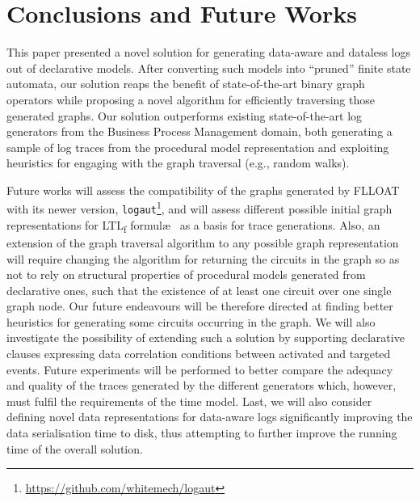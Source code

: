 \documentclass[sigconf]{acmart}
\newcommand{\LTLf}{\textup{LTL}\textsubscript{f}\xspace}
\begin{document}
\section{Conclusions and Future Works}\label{sec:conclfut}
This paper presented a novel solution for generating data-aware and dataless logs out of declarative models. After converting such models into ``pruned'' finite state automata, our solution reaps the benefit of state-of-the-art binary graph operators while proposing a novel algorithm for efficiently traversing those generated graphs. Our solution outperforms existing state-of-the-art log generators from the Business Process Management domain, both generating a sample of log traces from the procedural model representation and exploiting heuristics for engaging with the graph traversal (e.g., random walks).

Future works will assess the compatibility of the graphs generated by FLLOAT with its newer version, \texttt{logaut}\footnote{\url{https://github.com/whitemech/logaut}}, and will assess different possible initial graph representations for \LTLf formul\ae~ as a basis for trace generations. Also, an extension of the graph traversal algorithm to any possible graph representation will require changing the algorithm for returning the circuits in the graph so as not to rely on structural properties of procedural models generated from declarative ones, such that the existence of at least one circuit over one single graph node. Our future endeavours will be therefore directed at finding better heuristics for generating some circuits occurring in the graph. We will also investigate the possibility of extending such a solution by supporting declarative clauses expressing data correlation conditions between activated and targeted events.  Future experiments will be performed to better compare the adequacy and quality of the traces generated by the different generators which, however, must fulfil the requirements of the time model. Last, we will also consider defining novel data representations for data-aware logs significantly improving the data serialisation time to disk, thus attempting to further improve the running time of the overall solution.




\end{document}
